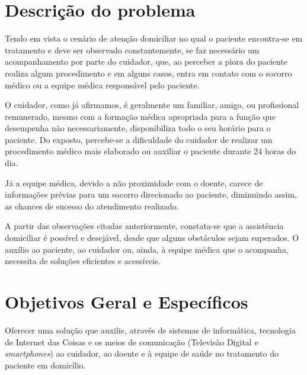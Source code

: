 \section{Descrição do problema}\label{sec:descricao-problema}

Tendo em vista o cenário de atenção domiciliar no qual o paciente
encontra-se em tratamento e deve ser observado constantemente, 
se faz necessário um acompanhamento por parte do cuidador, que, ao perceber 
a piora do paciente realiza algum procedimento e em alguns casos, entra 
em contato com o socorro médico ou a equipe médica responsável pelo paciente.

O cuidador, como já afirmamos, é geralmente um familiar, amigo, ou profissional
remunerado, mesmo com a formação médica apropriada para a função que desempenha não
necessariamente, disponibiliza todo o seu horário para o paciente. Do exposto,
percebe-se a dificuldade do cuidador de realizar um procedimento médico mais
elaborado ou auxiliar o paciente durante 24 horas do dia.

Já a equipe médica, devido a não proximidade com o doente, carece de informações
prévias para um socorro direcionado ao paciente, diminuindo assim, as chances de
sucesso do atendimento realizado.


A partir das observações citadas anteriormente, constata-se que a assistência
domiciliar é possível e desejável, desde que alguns obstáculos sejam superados.
O auxílio ao paciente, ao cuidador ou, ainda, à equipe médica que o
acompanha, necessita de soluções eficientes e acessíveis.

\section{Objetivos Geral e Específicos}\label{sec:objetivos}

Oferecer uma solução que auxilie, através de sistemas de informática, tecnologia
de Internet das Coisas e os meios de comunicação (Televisão Digital e 
\textit{smartphones}) ao cuidador, ao doente e à equipe de saúde no tratamento 
do paciente em domicílio.


